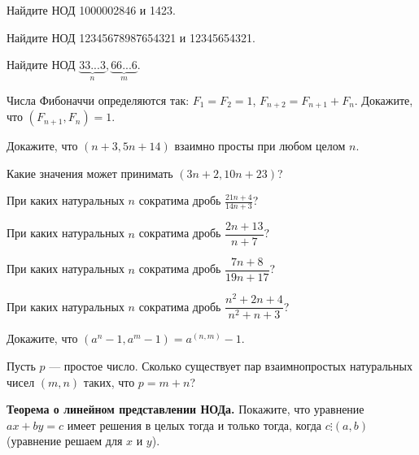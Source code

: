 \documentclass{article}
\begin{document}
    \begin{enumerate_boxed}

        \item Найдите НОД 1000002846 и 1423.

        \item Найдите НОД 12345678987654321 и 12345654321.

        \item Найдите НОД $\underbrace{33...3}_n, \underbrace{66...6}_m$.

        \item Числа Фибоначчи определяются так: $F_1 = F_2 = 1$, $F_{n+2} = F_{n+1} + F_n$.
        Докажите, что
        $(F_{n + 1}, F_n) = 1$.

        \item Докажите, что $(n + 3, 5n + 14)$ взаимно просты при любом целом $n$.

        \item Какие значения может принимать $(3n + 2, 10n + 23)$?

        \item При каких натуральных $n$ сократима дробь $\displaystyle \frac{21n + 4}{14n + 3}$?

        \item При каких натуральных $n$ сократима дробь $\dfrac{2n+13}{n+7}$?

        \item При каких натуральных $n$ сократима дробь $\dfrac{7n+8}{19n+17}$?

        \item При каких натуральных $n$ сократима дробь $\dfrac{n^2 +2n+4}{n^2 +n+3}$?

        \item Докажите, что $(a^n - 1, a^m - 1) = a^{(n, m)} - 1$.

        \item Пусть $p$ — простое число.
        Сколько существует пар взаимнопростых натуральных чисел $(m, n)$ таких, что $p = m + n$?

        \item \textbf{Теорема о линейном представлении НОДа.} Покажите, что уравнение $ax + by = c$ имеет решения в целых тогда и только тогда, когда $c \vdots (a, b)$(уравнение решаем для $x$ и $y$).

    \end{enumerate_boxed}
\end{document}
